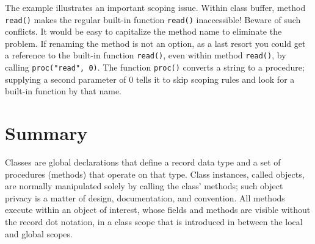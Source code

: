 The example illustrates an important scoping issue. Within class
buffer, method \texttt{read()} makes the regular built-in
function \texttt{read()} inaccessible! Beware of such
conflicts. It would be easy to capitalize the method name to
eliminate the problem. If renaming the method is not an option, as a
last resort you could get a reference to the built-in function
\texttt{read()}, even within method \texttt{read()}, by calling
\texttt{proc("read", 0)}. The function
\texttt{proc()} converts a string to a procedure; supplying a second
parameter of 0 tells it to skip scoping rules and look for a built-in
function by that name.

\section{Summary}

Classes are global declarations that define a record data type and a
set of procedures (methods) that operate on that type. Class instances,
called objects, are normally manipulated solely by calling
the class' methods; such object privacy is a matter of
design, documentation, and
convention. All methods execute within an
object of interest, whose fields and methods are visible
without the record dot notation, in a
class scope that is introduced in between the local and global scopes.




\bigskip
